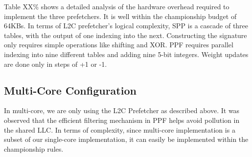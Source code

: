 Table XX\% shows a detailed analysis of the hardware overhead required to implement the three 
prefetchers. It is well within the championship budget of 64KBs. In terms of L2C prefetcher's logical 
complexity, SPP is a cascade of three tables, with the output of one indexing into the next.
Constructing the signature only requires simple operations like shifting and XOR. PPF requires
parallel indexing into nine different tables and adding nine 5-bit integers. Weight updates are
done only in steps of +1 or -1.


\subsection{Multi-Core Configuration}
\label{Config-Multi}

In multi-core, we are only using the L2C Prefetcher as described above. It was observed that
the efficient filtering mechanism in PPF helps avoid pollution in the shared LLC. In terms of
complexity, since multi-core implementation is a subset of our single-core implementation, 
it can easily be implemented within the championship rules.
